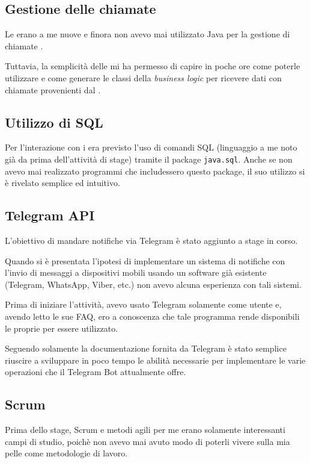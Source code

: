 \subsection{Gestione delle chiamate }

Le  erano a me nuove e finora non avevo mai utilizzato Java per
la gestione di chiamate .

Tuttavia, la semplicità delle  mi ha permesso di capire in poche
ore come poterle utilizzare e come generare le classi della \emph{business
logic} per ricevere dati con chiamate  provenienti dal \FREND.

\subsection{Utilizzo di SQL}

Per l'interazione con i  era previsto l'uso di comandi SQL
(linguaggio a me noto già da prima dell'attività di stage) tramite il package
\texttt{java.sql}. Anche se non avevo mai realizzato programmi che includessero
questo package, il suo utilizzo si è rivelato semplice ed intuitivo.

\subsection{Telegram API}

L'obiettivo di mandare notifiche via Telegram è stato aggiunto a stage in
corso.

Quando si è presentata l'ipotesi di implementare un sistema di notifiche con
l'invio di messaggi a dispositivi mobili usando un software già esistente
(Telegram, WhatsApp, Viber, etc.) non avevo alcuna esperienza con tali
sistemi.

Prima di iniziare l'attività, avevo usato Telegram solamente come utente e,
avendo letto le sue FAQ, ero a conoscenza che tale programma rende disponibili
le proprie  per essere utilizzato.

Seguendo solamente la documentazione fornita da Telegram è stato semplice
riuscire a sviluppare in poco tempo le abilità necessarie per implementare le
varie operazioni che il Telegram Bot attualmente offre.

\subsection{Scrum}

Prima dello stage, Scrum e metodi agili per me erano solamente interessanti
campi di studio, poichè non avevo mai avuto modo di poterli vivere sulla mia
pelle come metodologie di lavoro.

